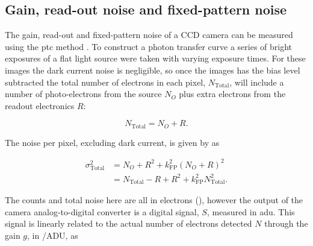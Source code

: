 \begin{colsection}
\begin{colsection}
\clearpage

\end{colsection}

\newpage
\subsection{Gain, read-out noise and fixed-pattern noise}
\label{sec:ptc}
\begin{colsection}

The gain, read-out and fixed-pattern noise of a CCD camera can be measured using the \gls{ptc} method \citep{CCDs, PTC}. To construct a photon transfer curve a series of bright exposures of a flat light source were taken with varying exposure times. For these images the dark current noise is negligible, so once the images has the bias level subtracted the total number of electrons in each pixel, $N_\text{Total}$, will include a number of  photo-electrons from the source $N_O$ plus extra electrons from the readout electronics $R$:

\begin{equation}
    N_\text{Total} = N_O + R.
    \label{eq:total_count}
\end{equation}

The noise per pixel, excluding dark current, is given by  as

\begin{equation}
    \begin{split}
        \sigma_\text{Total}^2 & = N_O + R^2 + k_\text{FP}^2{(N_O + R)}^2 \\
                              & = N_\text{Total} - R + R^2 + k_\text{FP}^2N_\text{Total}^2.
    \end{split}
    \label{eq:ptc_noise1}
\end{equation}

The counts and total noise here are all in electrons (\elec), however the output of the camera analog-to-digital converter is a digital signal, $S$, measured in \gls{adu}. This signal is linearly related to the actual number of electrons detected $N$ through the gain $g$, in \elec/ADU, as


\end{colsection}
\end{colsection}
